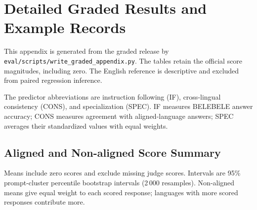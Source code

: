 \chapter{Detailed Graded Results and Example Records}

\label{app:graded-details}

This appendix is generated from the graded release by \texttt{eval/scripts/write\_graded\_appendix.py}. The tables retain the official score magnitudes, including zero. The English reference is descriptive and excluded from paired regression inference.

The predictor abbreviations are instruction following (IF), cross-lingual consistency (CONS), and specialization (SPEC). IF measures BELEBELE answer accuracy; CONS measures agreement with aligned-language answers; SPEC averages their standardized values with equal weights.

\section{Aligned and Non-aligned Score Summary}

Means include zero scores and exclude missing judge scores. Intervals are 95\% prompt-cluster percentile bootstrap intervals (2\,000 resamples). Non-aligned means give equal weight to each scored response; languages with more scored responses contribute more.

\begingroup\footnotesize\setlength{\tabcolsep}{3pt}\renewcommand{\arraystretch}{1.12}

